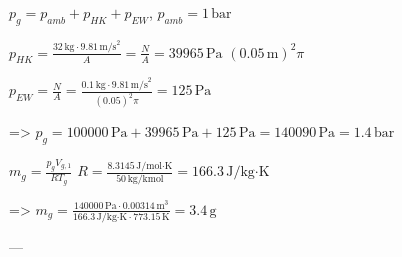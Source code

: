 \( p_{g} = p_{amb} + p_{HK} + p_{EW} \), \( p_{amb} = 1 \, \text{bar} \)  

\( p_{HK} = \frac{32 \, \text{kg} \cdot 9.81 \, \text{m/s}^2}{A} = \frac{N}{A} = 39965 \, \text{Pa} \)  
\((0.05 \, \text{m})^2 \pi \)  

\( p_{EW} = \frac{N}{A} = \frac{0.1 \, \text{kg} \cdot 9.81 \, \text{m/s}^2}{(0.05)^2 \pi} = 125 \, \text{Pa} \)  

=> \( p_{g} = 100000 \, \text{Pa} + 39965 \, \text{Pa} + 125 \, \text{Pa} = 140090 \, \text{Pa} = 1.4 \, \text{bar} \)  

\( m_{g} = \frac{p_{g} V_{g,1}}{R T_{g}} \)  
\( R = \frac{8.3145 \, \text{J/mol·K}}{50 \, \text{kg/kmol}} = 166.3 \, \text{J/kg·K} \)  

=> \( m_{g} = \frac{140000 \, \text{Pa} \cdot 0.00314 \, \text{m}^3}{166.3 \, \text{J/kg·K} \cdot 773.15 \, \text{K}} = 3.4 \, \text{g} \)  

---
